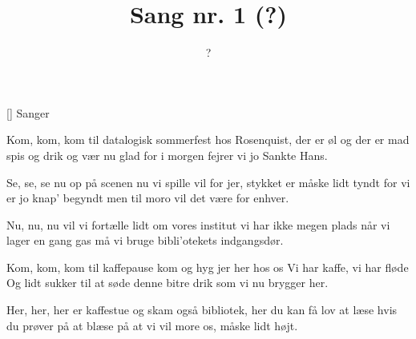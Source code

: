 \documentclass[a4paper,11pt]{article}
\title{Sang nr. 1 (?)}
\author{?}
\begin{document}
\maketitle

\begin{roles}
[] Sanger
\end{roles}

\begin{song}
 Kom, kom, kom til datalogisk
sommerfest hos Rosenquist,
der er øl og der er mad
spis og drik og vær nu glad
for i morgen fejrer vi jo Sankte Hans.

Se, se, se nu op på scenen
nu vi spille vil for jer,
stykket er måske lidt tyndt
for vi er jo knap' begyndt
men til moro vil det være for enhver.

Nu, nu, nu vil vi fortælle
lidt om vores institut
vi har ikke megen plads
når vi lager en gang gas
må vi bruge bibli'otekets indgangsdør.

Kom, kom, kom til kaffepause
kom og hyg jer her hos os
Vi har kaffe, vi har fløde
Og lidt sukker til at søde
denne bitre drik som vi nu brygger her.

Her, her, her er kaffestue
og skam også bibliotek,
her du kan få lov at læse
hvis du prøver på at blæse
på at vi vil more os, måske lidt højt.
\end{song}
\end{document}
